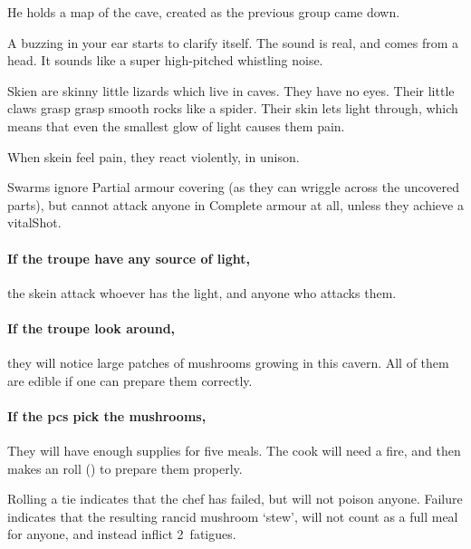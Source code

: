 \begin{multicols}{2}
He holds a map of the cave, created as the previous group came down.

\begin{boxtext}
  A buzzing in your ear starts to clarify itself.
  The sound is real, and comes from a head.
  It sounds like a super high-pitched whistling noise.
\end{boxtext}


Skien are skinny little lizards which live in caves.
They have no eyes.
Their little claws grasp grasp smooth rocks like a spider.
Their skin lets light through, which means that even the smallest glow of light causes them pain.

When skein feel pain, they react violently, in unison.

\skeinSwarm

Swarms ignore Partial armour covering (as they can wriggle across the uncovered parts), but cannot attack anyone in Complete armour at all, unless they achieve a \gls{vitalShot}.%

\paragraph{If the troupe have any source of light,}
the skein attack whoever has the light, and anyone who attacks them.

\paragraph{If the troupe look around,}
they will notice large patches of mushrooms growing in this cavern.
All of them are edible if one can prepare them correctly.

\paragraph{If the \glspl{pc} pick the mushrooms,}
They will have enough supplies for five meals.
The cook will need a fire,%
and then makes an  roll (\tn[10]) to prepare them properly.

Rolling a tie indicates that the chef has failed, but will not poison anyone.
Failure indicates that the resulting rancid mushroom `stew', will not count as a full meal for anyone, and instead inflict 2~\glspl{fatigue}.



\end{multicols}
